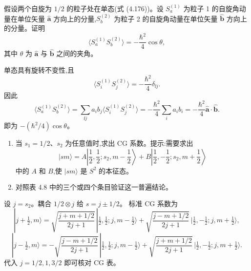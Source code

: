 \begin{question}
假设两个自旋为 $1/2$ 的粒子处在单态(式 (4.176))。设 $S_a^{(1)}$ 为粒子 1 的自旋角动量在单位矢量 $\hat{\mathbf a}$ 方向上的分量,$S_b^{(2)}$ 为粒子 2 的自旋角动量在单位矢量 $\hat{\mathbf b}$ 方向上的分量。证明
\[
\bigl\langle S_a^{(1)}S_b^{(2)}\bigr\rangle=-\frac{\hbar^2}{4}\cos\theta,
\]
其中 $\theta$ 为 $\hat{\mathbf a}$ 与 $\hat{\mathbf b}$ 之间的夹角。

\par\smallskip
{}

\begin{solution}

单态具有旋转不变性,且
\[
\langle S_i^{(1)}S_j^{(2)}\rangle=-\frac{\hbar^2}{4}\delta_{\ii j}.
\]
因此
\[
\langle S_a^{(1)}S_b^{(2)}\rangle
=\sum_{\ii j}a_i b_j\langle S_i^{(1)}S_j^{(2)}\rangle
=-\frac{\hbar^2}{4}\sum_i a_i b_i
=-\frac{\hbar^2}{4}\hat{\mathbf a}\cdot\hat{\mathbf b}.
\]
即为 $-(\hbar^2/4)\cos\theta$。

\end{solution}
\end{question}

\begin{question}
\begin{enumerate}
\item 当 $s_1=1/2$、$s_2$ 为任意值时,求出 CG 系数。提示:需要求出
\[
|sm\rangle=A\left|\frac12,\frac12;s_2,m-\frac12\right\rangle+B\left|\frac12,-\frac12;s_2,m+\frac12\right\rangle
\]
中的 $A$ 和 $B$,使 $|sm\rangle$ 是 $S^2$ 的本征态。
\item 对照表 4.8 中的三个或四个条目验证这一普遍结论。
\end{enumerate}
\begin{solution}

设 $j=s_2$。耦合 $1/2\otimes j$ 给 $s=j\pm1/2$。
标准 CG 系数为
\[
|j+\tfrac12,m\rangle=
\sqrt{\frac{j+m+1/2}{2j+1}}\,|\tfrac12,\tfrac12;j,m-\tfrac12\rangle
+\sqrt{\frac{j-m+1/2}{2j+1}}\,|\tfrac12,-\tfrac12;j,m+\tfrac12\rangle,
\]
\[
|j-\tfrac12,m\rangle=
-\sqrt{\frac{j-m+1/2}{2j+1}}\,|\tfrac12,\tfrac12;j,m-\tfrac12\rangle
+\sqrt{\frac{j+m+1/2}{2j+1}}\,|\tfrac12,-\tfrac12;j,m+\tfrac12\rangle.
\]
代入 $j=1/2,1,3/2$ 即可核对 CG 表。

\end{solution}
\end{question}

